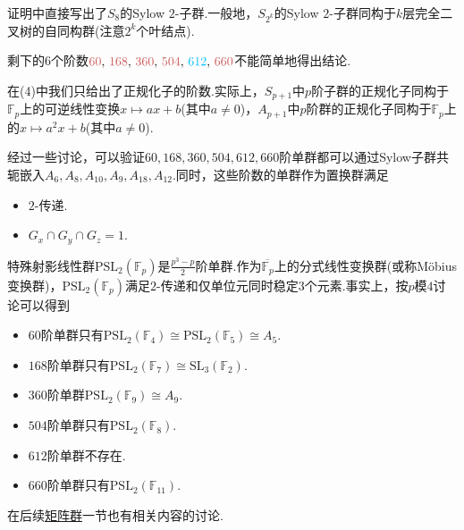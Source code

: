 \begin{remark}
	证明中直接写出了$S_8$的Sylow $2$-子群.一般地，$S_{2^k}$的Sylow $2$-子群同构于$k$层完全二叉树的自同构群(注意$2^k$个叶结点).
\end{remark}
\begin{remark}
	剩下的$6$个阶数${\color{IndianRed}60},\,{\color{IndianRed}168},\,{\color{IndianRed}360},\,{\color{IndianRed}504},\,{\color{DeepSkyBlue}612},\,{\color{IndianRed}660}$不能简单地得出结论.
	
	在(4)中我们只给出了正规化子的阶数.实际上，$S_{p+1}$中$p$阶子群的正规化子同构于$\mathbb{F}_p$上的可逆线性变换$x\mapsto ax+b$(其中$a\ne 0$)，$A_{p+1}$中$p$阶群的正规化子同构于$\mathbb{F}_p$上的$x\mapsto a^2x+b$(其中$a\ne 0$).

	经过一些讨论，可以验证$60,168,360,504,612,660$阶单群都可以通过Sylow子群共轭嵌入$A_6,A_8,A_{10},A_9,A_{18},A_{12}$.同时，这些阶数的单群作为置换群满足
	\begin{itemize}
		\item $2$-传递.
		\item $G_x\cap G_y\cap G_z=1$.
	\end{itemize}

	特殊射影线性群$\mathrm{PSL}_2(\mathbb{F}_p)$是$\frac{p^3-p}{2}$阶单群.作为$\overline{\mathbb{F}_p}$上的分式线性变换群(或称M\"obius变换群)，$\mathrm{PSL}_2(\mathbb{F}_p)$满足$2$-传递和仅单位元同时稳定$3$个元素.事实上，按$p$模$4$讨论可以得到
	\begin{itemize}
		\item $60$阶单群只有$\mathrm{PSL}_2(\mathbb{F}_4)\cong\mathrm{PSL}_2(\mathbb{F}_5)\cong A_5$.
		\item $168$阶单群只有$\mathrm{PSL}_2(\mathbb{F}_7)\cong\mathrm{SL}_3(\mathbb{F}_2)$.
		\item $360$阶单群$\mathrm{PSL}_2(\mathbb{F}_9)\cong A_9$.
		\item $504$阶单群只有$\mathrm{PSL}_2(\mathbb{F}_8)$.
		\item $612$阶单群不存在.
		\item $660$阶单群只有$\mathrm{PSL}_2(\mathbb{F}_{11})$.
	\end{itemize}

	在后续\hyperlink{subsec:MatrixGrp}{矩阵群}一节也有相关内容的讨论.
\end{remark}

